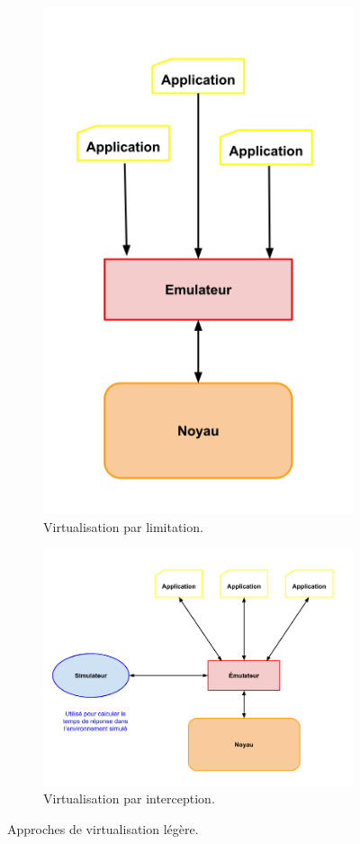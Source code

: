 \begin{figure}[H]
  \centering
  \begin{subfigure}{0.3\textwidth}
    \includegraphics[scale=0.38]{Pictures/png/Virtualisation_limitation}
    \caption{Virtualisation par limitation.}
    \label{Virtu_limitation}
  \end{subfigure}
  \begin{subfigure}{0.4\textwidth}
    \includegraphics[scale=0.3]{Pictures/png/Virtualisation_interception}
    \caption{Virtualisation par interception.}
    \label{Virtu_interception}
  \end{subfigure}
  \caption{Approches de virtualisation légère.}
  \label{TYPE_VIRTUALISATION}
\end{figure}
